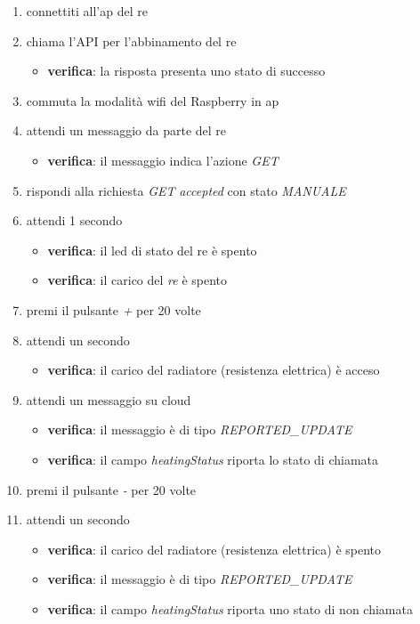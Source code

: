 \documentclass[12pt,a4paper,twoside,titlepage]{book}
\begin{document}
\begin{enumerate}
    \item connettiti all'\acrshort{ap} del \acrshort{re}
    \item chiama l'API per l'abbinamento del \acrshort{re} 
    \begin{itemize}
        \item \textbf{verifica}: la risposta presenta uno stato di successo 
    \end{itemize}
    \item commuta la modalità \Gls{wifi} del Raspberry in \acrshort{ap}
    \item attendi un messaggio da parte del \acrshort{re}
    \begin{itemize}
        \item \textbf{verifica}: il messaggio indica l'azione \textit{GET}
    \end{itemize}
    \item rispondi alla richiesta \textit{GET} \textit{accepted} con stato \textit{MANUALE}
    \item attendi 1 secondo
    \begin{itemize}
        \item \textbf{verifica}: il \acrshort{led} di stato del \acrshort{re} è spento 
        \item \textbf{verifica}: il carico del \textit{re} è spento
    \end{itemize}
    \item premi il pulsante \textit{+} per 20 volte
    \item attendi un secondo
    \begin{itemize}
        \item \textbf{verifica}: il carico del radiatore (resistenza elettrica) è acceso 
    \end{itemize}
    \item attendi un messaggio su cloud 
    \begin{itemize}
        \item \textbf{verifica}: il messaggio è di tipo \textit{REPORTED\_UPDATE}
        \item \textbf{verifica}: il campo \textit{heatingStatus} riporta lo stato di chiamata 
    \end{itemize}
    \item premi il pulsante \textit{-} per 20 volte 
    \item attendi un secondo 
    \begin{itemize}
        \item \textbf{verifica}: il carico del radiatore (resistenza elettrica) è spento 
    \end{itemize}
    \begin{itemize}
        \item \textbf{verifica}: il messaggio è di tipo \textit{REPORTED\_UPDATE}
        \item \textbf{verifica}: il campo \textit{heatingStatus} riporta uno stato di non chiamata 
    \end{itemize}
\end{enumerate}
\end{document}
